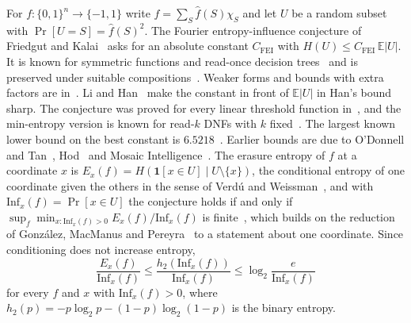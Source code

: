 \documentclass[11pt]{amsart}
\theoremstyle{remark}
\newcommand{\Inf}{\mathrm{Inf}}
\newcommand{\E}{\mathbb{E}}
\begin{document}
For $f\colon\{0,1\}^n\to\{-1,1\}$ write $f=\sum_S\hat f(S)\chi_S$ and let $U$ be a random subset with
$\Pr[U=S]=\hat f(S)^2$. The Fourier entropy-influence conjecture of Friedgut and Kalai~\cite{FK96} asks for an absolute
constant $C_{\mathrm{FEI}}$ with $H(U)\le C_{\mathrm{FEI}}\,\E|U|$. It is known for symmetric functions and read-once decision trees~\cite{OWZ} and is
preserved under suitable compositions~\cite{OT13}. Weaker forms and bounds with extra factors are
in~\cite{CKLS,WWW,KKLMS,Han}. Li and Han~\cite{LH25} make the constant in front of $\E|U|$ in Han's bound
sharp. The conjecture was proved for every linear threshold function in~\cite{ShmLTF}, and the min-entropy version is
known for read-$k$ DNFs with $k$ fixed~\cite{Shalev,ACKSW}. The largest known lower bound on the best constant is
$6.5218$~\cite{Num26}. Earlier bounds are due to O'Donnell and Tan~\cite{OT13}, Hod~\cite{Hod} and Mosaic
Intelligence~\cite{MI26a,MI26b}. The erasure entropy of $f$ at a
coordinate $x$ is $E_x(f)=H(\mathbf 1[x\in U]\mid U\setminus\{x\})$, the conditional entropy of one coordinate given
the others in the sense of Verd\'u and Weissman~\cite{VW08}, and with $\Inf_x(f)=\Pr[x\in U]$ the conjecture holds if
and only if $\sup_f\min_{x:\Inf_x(f)>0}E_x(f)/\Inf_x(f)$ is finite~\cite{Shm1}, which builds on the
reduction of Gonz\'alez, MacManus and Pereyra~\cite{GMP} to a statement about one coordinate. Since conditioning does not increase
entropy,
\begin{equation}\label{eq:upper}
\frac{E_x(f)}{\Inf_x(f)}\le\frac{h_2(\Inf_x(f))}{\Inf_x(f)}\le\log_2\frac{e}{\Inf_x(f)}
\end{equation}
for every $f$ and $x$ with $\Inf_x(f)>0$, where $h_2(p)=-p\log_2p-(1-p)\log_2(1-p)$ is the binary entropy.
\end{document}

